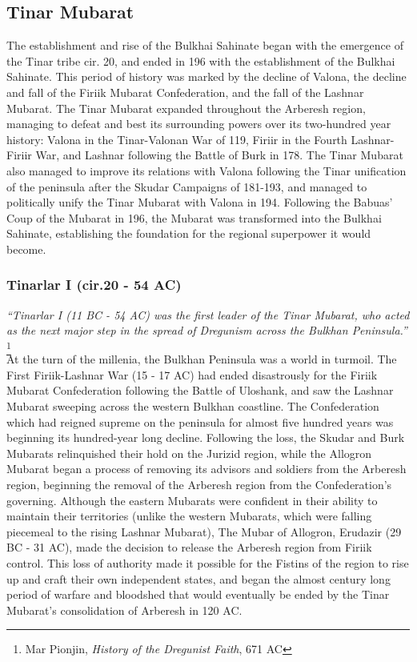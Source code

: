 \begin{multicols}{2}
	\section{Tinar Mubarat}
			The establishment and rise of the Bulkhai Sahinate began with the emergence of the Tinar tribe cir. 20, and ended in 196 with the establishment of the Bulkhai Sahinate. This period of history was marked by the decline of Valona, the decline and fall of the Firiik Mubarat Confederation, and the fall of the Lashnar Mubarat. The Tinar Mubarat expanded throughout the Arberesh region, managing to defeat and best its surrounding powers over its two-hundred year history: Valona in the Tinar-Valonan War of 119, Firiir in the Fourth Lashnar-Firiir War, and Lashnar following the Battle of Burk in 178. The Tinar Mubarat also managed to improve its relations with Valona following the Tinar unification of the peninsula after the Skudar Campaigns of 181-193, and managed to politically unify the Tinar Mubarat with Valona in 194. Following the Babuas' Coup of the Mubarat in 196, the Mubarat was transformed into the Bulkhai Sahinate, establishing the foundation for the regional superpower it would become.
			\subsubsection{Tinarlar I (cir.20 - 54 AC)}
					\textit{``Tinarlar I (11 BC - 54 AC) was the first leader of the Tinar Mubarat, who acted as the next major step in the spread of Dregunism across the Bulkhan Peninsula.''} \footnote{Mar Pionjin, \textit{History of the Dregunist Faith}, 671 AC}\\
						At the turn of the millenia, the Bulkhan Peninsula was a world in turmoil. The First Firiik-Lashnar War (15 - 17 AC) had ended disastrously for the Firiik Mubarat Confederation following the Battle of Uloshank, and saw the Lashnar Mubarat sweeping across the western Bulkhan coastline. The Confederation which had reigned supreme on the peninsula for almost five hundred years was beginning its hundred-year long decline. Following the loss, the Skudar and Burk Mubarats relinquished their hold on the Jurizid region, while the Allogron Mubarat began a process of removing its advisors and soldiers from the Arberesh region, beginning the removal of the Arberesh region from the Confederation's governing. Although the eastern Mubarats were confident in their ability to maintain their territories (unlike the western Mubarats, which were falling piecemeal to the rising Lashnar Mubarat), The Mubar of Allogron, Erudazir (29 BC - 31 AC), made the decision to release the Arberesh region from Firiik control. This loss of authority made it possible for the Fistins of the region to rise up and craft their own independent states, and began the almost century long period of warfare and bloodshed that would eventually be ended by the Tinar Mubarat's consolidation of Arberesh in 120 AC. 
						

\end{multicols}

